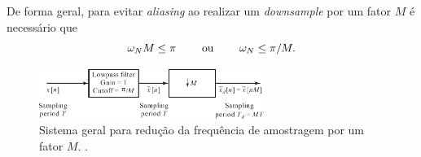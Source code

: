 \begin{frame}[allowframebreaks]
  \framebreak
  De forma geral, para evitar \textit{aliasing} ao realizar um \textit{downsample} por um fator $M$
  é necessário que
  \begin{equation}
  \omega_N M \leq \pi \quad \quad \textmd{ ou } \quad \quad \omega_N \leq \pi/M.
  \end{equation}

        \begin{figure}[h!]
        \centering
        \includegraphics[width=0.65\textwidth]{images/fig422.pdf}
        \caption{Sistema geral para redução da frequência de amostragem por um fator $M$. \citep{oppenheim2009}.}
        \label{fig:fig422}
        \end{figure}

\end{frame}


